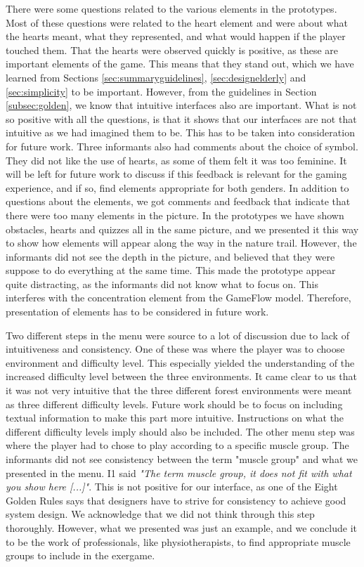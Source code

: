 There were some questions related to the various elements in the prototypes. Most of these questions were related to the heart element and were about what the hearts meant, what they represented, and what would happen if the player touched them. That the hearts were observed quickly is positive, as these are important elements of the game. This means that they stand out, which we have learned from Sections \ref{sec:summaryguidelines}, \ref{sec:designelderly} and \ref{sec:simplicity} to be important. However, from the guidelines in Section \ref{subsec:golden}, we know that intuitive interfaces also are important. What is not so positive with all the questions, is that it shows that our interfaces are not that intuitive as we had imagined them to be. This has to be taken into consideration for future work. Three informants also had comments about the choice of symbol. They did not like the use of hearts, as some of them felt it was too feminine. It will be left for future work to discuss if this feedback is relevant for the gaming experience, and if so, find elements appropriate for both genders. In addition to questions about the elements, we got comments and feedback that indicate that there were too many elements in the picture. In the prototypes we have shown obstacles, hearts and quizzes all in the same picture, and we presented it this way to show how elements will appear along the way in the nature trail. However, the informants did not see the depth in the picture, and believed that they were suppose to do everything at the same time. This made the prototype appear quite distracting, as the informants did not know what to focus on. This interferes with the concentration element from the GameFlow model. Therefore, presentation of elements has to be considered in future work. 

Two different steps in the menu were source to a lot of discussion due to lack of intuitiveness and consistency. One of these was where the player was to choose environment and difficulty level. This especially yielded the understanding of the increased difficulty level between the three environments. It came clear to us that it was not very intuitive that the three different forest environments were meant as three different difficulty levels. Future work should be to focus on including textual information to make this part more intuitive. Instructions on what the different difficulty levels imply should also be included.  The other menu step was where the player had to chose to play according to a specific muscle group. The informants did not see consistency between the term "muscle group" and what we presented in the menu. I1 said \emph{"The term muscle group, it does not fit with what you show here [...]"}. This is not positive for our interface, as one of the Eight Golden Rules says that designers have to strive for consistency to achieve good system design. We acknowledge that we did not think through this step thoroughly. However, what we presented was just an example, and we conclude it to be the work of professionals, like physiotherapists, to find appropriate muscle groups to include in the exergame.

